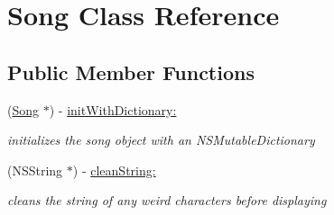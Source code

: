 \hypertarget{interface_song}{\section{Song Class Reference}
\label{interface_song}
}
\subsection*{Public Member Functions}
\begin{DoxyCompactItemize}
\item 
\hypertarget{interface_song_a2189d269474a6d6e0c50402d4956b776}{(\hyperlink{interface_song}{Song} $\ast$) -\/ \hyperlink{interface_song_a2189d269474a6d6e0c50402d4956b776}{init\-With\-Dictionary\-:}}\label{interface_song_a2189d269474a6d6e0c50402d4956b776}

\begin{DoxyCompactList}\small\item\em initializes the song object with an N\-S\-Mutable\-Dictionary \end{DoxyCompactList}\item 
\hypertarget{interface_song_ad0fff5566893db83037ec2c93987c198}{(N\-S\-String $\ast$) -\/ \hyperlink{interface_song_ad0fff5566893db83037ec2c93987c198}{clean\-String\-:}}\label{interface_song_ad0fff5566893db83037ec2c93987c198}

\begin{DoxyCompactList}\small\item\em cleans the string of any weird characters before displaying \end{DoxyCompactList}\end{DoxyCompactItemize}
